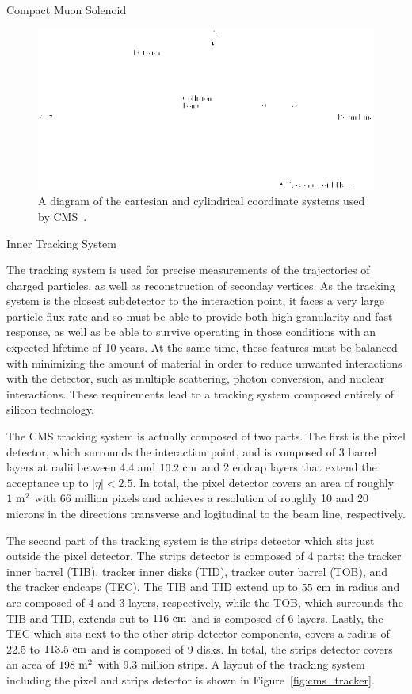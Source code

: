 \begin{section}{Compact Muon Solenoid}
\begin{figure}[tbp!]
\begin{center}
\includegraphics[angle=0,width=0.80\columnwidth]{fig/cms_coordinate_system.png}
\end{center}
\caption{A diagram of the cartesian and cylindrical coordinate systems used by CMS~\cite{Schott:1699952}.}
\label{fig:cms_coordinate_system}
\end{figure}

\begin{subsection}{Inner Tracking System}

The tracking system is used for precise measurements of the trajectories of charged particles, as well as reconstruction of seconday vertices.
As the tracking system is the closest subdetector to the interaction point, it faces a very large particle flux rate and so must be able to provide both high granularity and fast response, as well as be able to survive operating in those conditions with an expected lifetime of 10 years.
At the same time, these features must be balanced with minimizing the amount of material in order to reduce unwanted interactions with the detector, such as multiple scattering, photon conversion, and nuclear interactions.
These requirements lead to a tracking system composed entirely of silicon technology.

The CMS tracking system is actually composed of two parts.
The first is the pixel detector, which surrounds the interaction point, and is composed of 3 barrel layers at radii between $4.4$ and $10.2~\mathrm{cm}$ and 2 endcap layers that extend the acceptance up to $|\eta| < 2.5$.
In total, the pixel detector covers an area of roughly $1~\mathrm{m}^2$ with 66 million pixels and achieves a resolution of roughly 10 and 20 microns in the directions transverse and logitudinal to the beam line, respectively.

The second part of the tracking system is the strips detector which sits just outside the pixel detector.
The strips detector is composed of 4 parts: the tracker inner barrel (TIB), tracker inner disks (TID), tracker outer barrel (TOB), and the tracker endcaps (TEC).
The TIB and TID extend up to $55~\mathrm{cm}$ in radius and are composed of 4 and 3 layers, respectively, while the TOB, which surrounds the TIB and TID, extends out to $116~\mathrm{cm}$ and is composed of 6 layers.
Lastly, the TEC which sits next to the other strip detector components, covers a radius of 22.5 to $113.5~\mathrm{cm}$ and is composed of 9 disks.
In total, the strips detector covers an area of $198~\mathrm{m}^2$ with 9.3 million strips.
A layout of the tracking system including the pixel and strips detector is shown in Figure~\ref{fig:cms_tracker}.


\end{subsection}
\end{section}
